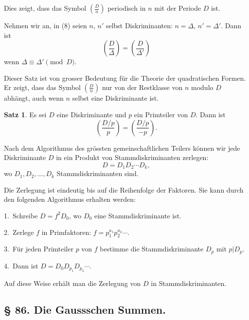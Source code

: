 \documentclass[12pt,a4paper]{article}
\theoremstyle{definition}
\newtheorem*{satz}{Satz}
\begin{document}
Dies zeigt, dass das Symbol $\left(\frac{D}{n}\right)$ periodisch in $n$
mit der Periode $D$ ist.

Nehmen wir an, in (8) seien $n$, $n'$ selbst Diskriminanten:
$n = \Delta$, $n' = \Delta'$. Dann ist
\begin{equation}\tag{14}
\left(\frac{D}{\Delta}\right) = \left(\frac{D}{\Delta'}\right)
\end{equation}
wenn $\Delta \equiv \Delta' \pmod{D}$.

Dieser Satz ist von grosser Bedeutung f\"ur die Theorie der
quadratischen Formen. Er zeigt, dass das Symbol $\left(\frac{D}{n}\right)$
nur von der Restklasse von $n$ modulo $D$ abh\"angt, auch wenn
$n$ selbst eine Diskriminante ist.

\begin{satz}
Es sei $D$ eine Diskriminante und $p$ ein Primteiler von $D$.
Dann ist
\begin{equation}\tag{15}
\left(\frac{D/p}{p}\right) = \left(\frac{D/p}{-p}\right).
\end{equation}
\end{satz}

Nach dem Algorithmus des gr\"ossten gemeinschaftlichen
Teilers k\"onnen wir jede Diskriminante $D$ in ein Produkt
von Stammdiskriminanten zerlegen:
\begin{equation}\tag{16}
D = D_1 D_2 \cdots D_k,
\end{equation}
wo $D_1, D_2, \ldots, D_k$ Stammdiskriminanten sind.

Die Zerlegung ist eindeutig bis auf die Reihenfolge der
Faktoren. Sie kann durch den folgenden Algorithmus erhalten
werden:

1.~Schreibe $D = f^2 D_0$, wo $D_0$ eine Stammdiskriminante
ist.

2.~Zerlege $f$ in Primfaktoren: $f = p_1^{a_1} p_2^{a_2} \cdots$.

3.~F\"ur jeden Primteiler $p$ von $f$ bestimme die
Stammdiskriminante $D_p$ mit $p | D_p$.

4.~Dann ist $D = D_0 D_{p_1} D_{p_2} \cdots$.

Auf diese Weise erh\"alt man die Zerlegung von $D$ in
Stammdiskriminanten.

\newpage
\subsection*{\S{} 86. Die Gaussschen Summen.}
\end{document}
